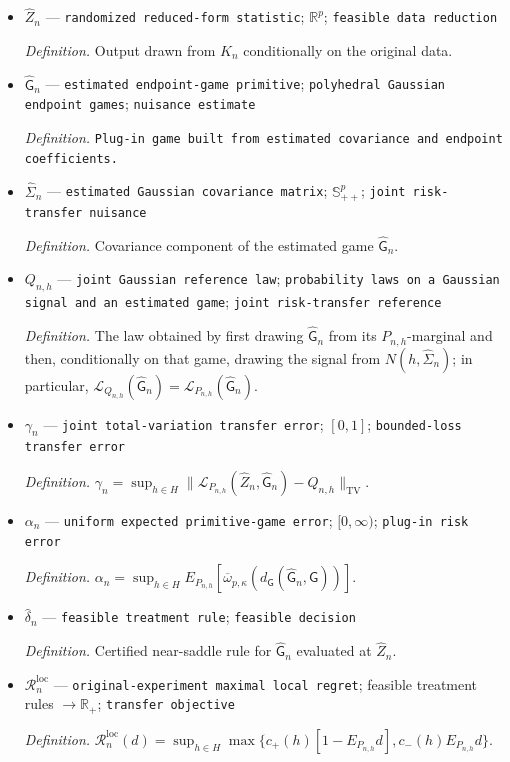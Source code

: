 \documentclass{article}
\begin{document}
\begin{itemize}
  \item \(\widehat Z_n\) --- \texttt{randomized reduced-\allowbreak{}form statistic}; \(\mathbb R^{p}\); \texttt{feasible data reduction}
  \par\smallskip\noindent\emph{Definition.} Output drawn from \(K_n\) conditionally on the original data.
  \item \(\widehat{\mathsf G}_n\) --- \texttt{estimated endpoint-\allowbreak{}game primitive}; \texttt{polyhedral Gaussian endpoint games}; \texttt{nuisance estimate}
  \par\smallskip\noindent\emph{Definition.} \texttt{Plug-\allowbreak{}in game built from estimated covariance and endpoint coefficients.}
  \item \(\widehat\Sigma_n\) --- \texttt{estimated Gaussian covariance matrix}; \(\mathbb S_{++}^{p}\); \texttt{joint risk-\allowbreak{}transfer nuisance}
  \par\smallskip\noindent\emph{Definition.} Covariance component of the estimated game \(\widehat{\mathsf G}_n\).
  \item \(Q_{n,h}\) --- \texttt{joint Gaussian reference law}; \texttt{probability laws on a Gaussian signal and an estimated game}; \texttt{joint risk-\allowbreak{}transfer reference}
  \par\smallskip\noindent\emph{Definition.} The law obtained by first drawing \(\widehat{\mathsf G}_n\) from its \(P_{n,h}\)-marginal and then, conditionally on that game, drawing the signal from \(N(h,\widehat\Sigma_n)\); in particular, \(\mathcal L_{Q_{n,h}}(\widehat{\mathsf G}_n)=\mathcal L_{P_{n,h}}(\widehat{\mathsf G}_n)\).
  \item \(\gamma_n\) --- \texttt{joint total-\allowbreak{}variation transfer error}; \([0,1]\); \texttt{bounded-\allowbreak{}loss transfer error}
  \par\smallskip\noindent\emph{Definition.} \(\gamma_n=\sup_{h\in H}\lVert\mathcal L_{P_{n,h}}(\widehat Z_n,\widehat{\mathsf G}_n)-Q_{n,h}\rVert_{\mathrm{TV}}\).
  \item \(\alpha_n\) --- \texttt{uniform expected primitive-\allowbreak{}game error}; \([0,\infty)\); \texttt{plug-\allowbreak{}in risk error}
  \par\smallskip\noindent\emph{Definition.} \(\alpha_n=\sup_{h\in H}E_{P_{n,h}}[\overline\omega_{p,\kappa}(d_{\mathsf G}(\widehat{\mathsf G}_n,\mathsf G))]\).
  \item \(\widehat\delta_n\) --- \texttt{feasible treatment rule}; \texttt{feasible decision}
  \par\smallskip\noindent\emph{Definition.} Certified near-saddle rule for \(\widehat{\mathsf G}_n\) evaluated at \(\widehat Z_n\).
  \item \(\mathcal R_n^{\mathrm{loc}}\) --- \texttt{original-\allowbreak{}experiment maximal local regret}; feasible treatment rules \(\to\mathbb R_{+}\); \texttt{transfer objective}
  \par\smallskip\noindent\emph{Definition.} \(\mathcal R_n^{\mathrm{loc}}(d)=\sup_{h\in H}\max\{c_+(h)[1-E_{P_{n,h}}d],c_-(h)E_{P_{n,h}}d\}\).
\end{itemize}
\end{document}
